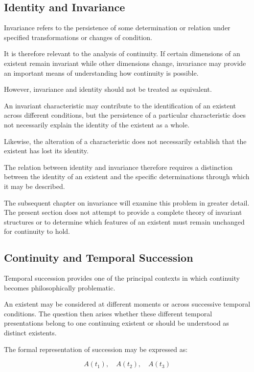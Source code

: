 \subsection{Identity and Invariance}

Invariance refers to the persistence of some determination or relation under specified transformations or changes of condition.

It is therefore relevant to the analysis of continuity. If certain dimensions of an existent remain invariant while other dimensions change, invariance may provide an important means of understanding how continuity is possible.

However, invariance and identity should not be treated as equivalent.

An invariant characteristic may contribute to the identification of an existent across different conditions, but the persistence of a particular characteristic does not necessarily explain the identity of the existent as a whole.

Likewise, the alteration of a characteristic does not necessarily establish that the existent has lost its identity.

The relation between identity and invariance therefore requires a distinction between the identity of an existent and the specific determinations through which it may be described.

The subsequent chapter on invariance will examine this problem in greater detail. The present section does not attempt to provide a complete theory of invariant structures or to determine which features of an existent must remain unchanged for continuity to hold.

\subsection{Continuity and Temporal Succession}

Temporal succession provides one of the principal contexts in which continuity becomes philosophically problematic.

An existent may be considered at different moments or across successive temporal conditions. The question then arises whether these different temporal presentations belong to one continuing existent or should be understood as distinct existents.

The formal representation of succession may be expressed as:

\[
A(t_1), \quad A(t_2), \quad A(t_3)
\]

